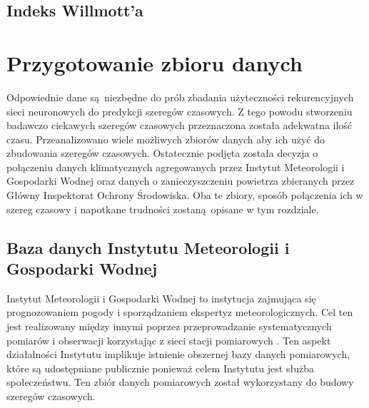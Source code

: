 \documentclass[10pt,a4paper]{article}
\begin{document}
\subsection{Indeks Willmott'a}

\newpage
\section{Przygotowanie zbioru danych}
Odpowiednie dane są niezbędne do prób zbadania użyteczności rekurencyjnych sieci neuronowych do predykcji szeregów czasowych. Z tego powodu stworzeniu badawczo ciekawych szeregów czasowych przeznaczona została adekwatna ilość czasu. Przeanalizowano wiele możliwych zbiorów danych aby ich użyć do zbudowania szeregów czasowych. Ostatecznie podjęta została decyzja o połączeniu danych klimatycznych agregowanych przez Instytut Meteorologii i Gospodarki Wodnej oraz danych o zanieczyszczeniu powietrza zbieranych przez Główny Inspektorat Ochrony Środowiska. Oba te zbiory, sposób połączenia ich w szereg czasowy i napotkane trudności zostaną opisane w tym rozdziale. 

\subsection{Baza danych Instytutu Meteorologii i Gospodarki Wodnej}
Instytut Meteorologii i Gospodarki Wodnej to instytucja zajmująca się prognozowaniem pogody i sporządzaniem ekspertyz meteorologicznych. Cel ten jest realizowany między innymi poprzez przeprowadzanie systematycznych pomiarów i obserwacji korzystając z sieci stacji pomiarowych \cite{imgwTask}. Ten aspekt działalności Instytutu implikuje istnienie obszernej bazy danych pomiarowych, które są udostępniane publicznie ponieważ celem Instytutu jest służba społeczeństwu. Ten zbiór danych pomiarowych został wykorzystany do budowy szeregów czasowych. 
\end{document}
